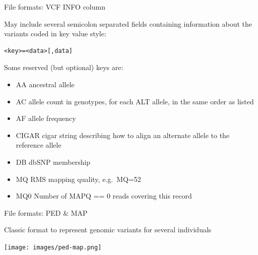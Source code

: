 \documentclass{beamer}
\begin{document}
\begin{frame}[fragile]{File formats: VCF INFO column}

May include several semicolon separated fields containing information
about the variants coded in key value style:

\begin{verbatim}
<key>=<data>[,data]
\end{verbatim}

Some reserved (but optional) keys are:

\begin{itemize}
\itemsep1pt\parskip0pt
\item
  AA ancestral allele
\item
  AC allele count in genotypes, for each ALT allele, in the same order
  as listed
\item
  AF allele frequency
\item
  CIGAR cigar string describing how to align an alternate allele to the
  reference allele
\item
  DB dbSNP membership
\item
  MQ RMS mapping quality, e.g.~MQ=52
\item
  MQ0 Number of MAPQ == 0 reads covering this record
\end{itemize}

\end{frame}

\begin{frame}{File formats: PED \& MAP}

Classic format to represent genomic variants for several individuals

\centerline{\texttt{[image: images/ped-map.png]}}

\end{frame}
\end{document}
